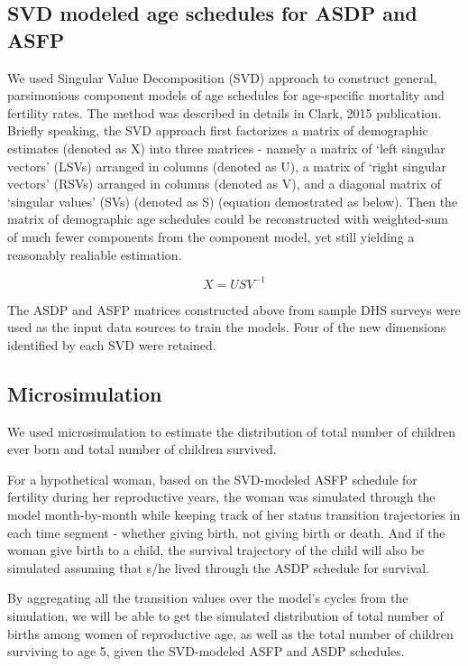 \documentclass[11pt,letterpaper]{article}
\begin{document}
\subsection*{SVD modeled age schedules for ASDP and ASFP}

We used Singular Value Decomposition (SVD) approach to construct general, parsimonious component models of age schedules for age-specific mortality and fertility rates. The method was described in details in Clark, 2015 publication. \cite{Clark:2015tp}  
Briefly speaking, the SVD approach first factorizes a matrix of demographic estimates (denoted as X) into three matrices - namely a matrix of ‘left singular vectors’ (LSVs) arranged in columns (denoted as U), a matrix of ‘right singular vectors’ (RSVs) arranged in columns (denoted as V), and a diagonal matrix of ‘singular values’ (SVs) (denoted as S) (equation demostrated as below). Then the matrix of demographic age schedules could be reconstructed with weighted-sum of much fewer components from the component model, yet still yielding a reasonably realiable estimation.  

$$
{X} = {U S V}^{-1}
$$

The ASDP and ASFP matrices constructed above from sample DHS surveys were used as the input data sources to train the models. Four of the new dimensions identified by each SVD were retained.  

\subsection*{Microsimulation}
We used microsimulation to estimate the distribution of total number of children ever born and total number of children survived.  

For a hypothetical woman, based on the SVD-modeled ASFP schedule for fertility during her reproductive years, the woman was simulated through the model month-by-month while keeping track of her status transition trajectories in each time segment - whether giving birth, not giving birth or death. And if the woman give birth to a child, the survival trajectory of the child will also be simulated assuming that s/he lived through the ASDP schedule for survival.  

By aggregating all the transition values over the model's cycles from the simulation, we will be able to get the simulated distribution of total number of births among women of reproductive age, as well as the total number of children surviving to age 5, given the SVD-modeled ASFP and ASDP schedules.  
\end{document}
